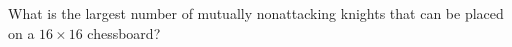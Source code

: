 What is the largest number of mutually nonattacking knights that can be placed on a $ 16\times16 $ chessboard?
